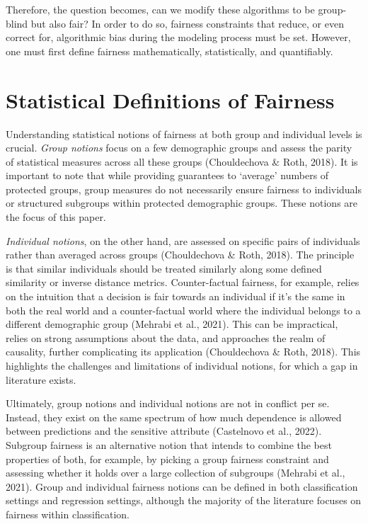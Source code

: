 \documentclass[12pt, twoside]{amherstthesis}
\begin{document}
Therefore, the question becomes, can we modify these algorithms to be group-blind but also fair? In order to do so, fairness constraints that reduce, or even correct for, algorithmic bias during the modeling process must be set. However, one must first define fairness mathematically, statistically, and quantifiably.

\hypertarget{fairnessdefinitions}{%
\section{Statistical Definitions of Fairness}\label{fairnessdefinitions}}

Understanding statistical notions of fairness at both group and individual levels is crucial. \emph{Group notions} focus on a few demographic groups and assess the parity of statistical measures across all these groups (Chouldechova \& Roth, 2018). It is important to note that while providing guarantees to `average' numbers of protected groups, group measures do not necessarily ensure fairness to individuals or structured subgroups within protected demographic groups. These notions are the focus of this paper.

\emph{Individual notions}, on the other hand, are assessed on specific pairs of individuals rather than averaged across groups (Chouldechova \& Roth, 2018). The principle is that similar individuals should be treated similarly along some defined similarity or inverse distance metrics. Counter-factual fairness, for example, relies on the intuition that a decision is fair towards an individual if it's the same in both the real world and a counter-factual world where the individual belongs to a different demographic group (Mehrabi et al., 2021). This can be impractical, relies on strong assumptions about the data, and approaches the realm of causality, further complicating its application (Chouldechova \& Roth, 2018). This highlights the challenges and limitations of individual notions, for which a gap in literature exists.

Ultimately, group notions and individual notions are not in conflict per se. Instead, they exist on the same spectrum of how much dependence is allowed between predictions and the sensitive attribute (Castelnovo et al., 2022). Subgroup fairness is an alternative notion that intends to combine the best properties of both, for example, by picking a group fairness constraint and assessing whether it holds over a large collection of subgroups (Mehrabi et al., 2021). Group and individual fairness notions can be defined in both classification settings and regression settings, although the majority of the literature focuses on fairness within classification.
\end{document}
